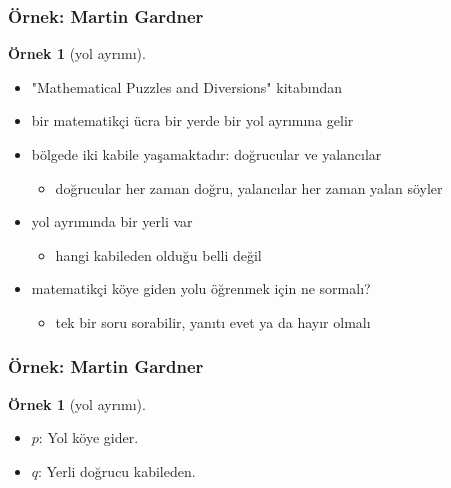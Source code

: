 \documentclass[dvipsnames]{beamer}
\theoremstyle{definition}
\theoremstyle{example}
\newtheorem{ornek}[theorem]{Örnek}
\theoremstyle{plain}
\begin{document}
\begin{frame}
  \frametitle{Örnek: Martin Gardner}

  \bigskip
  \hyperlink{formattr}{}

  \begin{ornek}[yol ayrımı]
    \begin{itemize}
      \item "Mathematical Puzzles and Diversions" kitabından

      \pause
      \medskip
      \item bir matematikçi ücra bir yerde bir yol ayrımına gelir
      \item bölgede iki kabile yaşamaktadır: doğrucular ve yalancılar
      \begin{itemize}
        \item doğrucular her zaman doğru, yalancılar her zaman yalan söyler
      \end{itemize}

      \item yol ayrımında bir yerli var
      \begin{itemize}
        \item hangi kabileden olduğu belli değil
      \end{itemize}

      \pause
      \item matematikçi köye giden yolu öğrenmek için ne sormalı?
      \begin{itemize}
        \item tek bir soru sorabilir, yanıtı evet ya da hayır olmalı
      \end{itemize}
    \end{itemize}
  \end{ornek}
\end{frame}

\begin{frame}
  \frametitle{Örnek: Martin Gardner}

  \begin{ornek}[yol ayrımı]
    \begin{itemize}
      \item $p$: Yol köye gider.
      \item $q$: Yerli doğrucu kabileden.
    \end{itemize}
  \end{ornek}
\end{frame}
\end{document}
